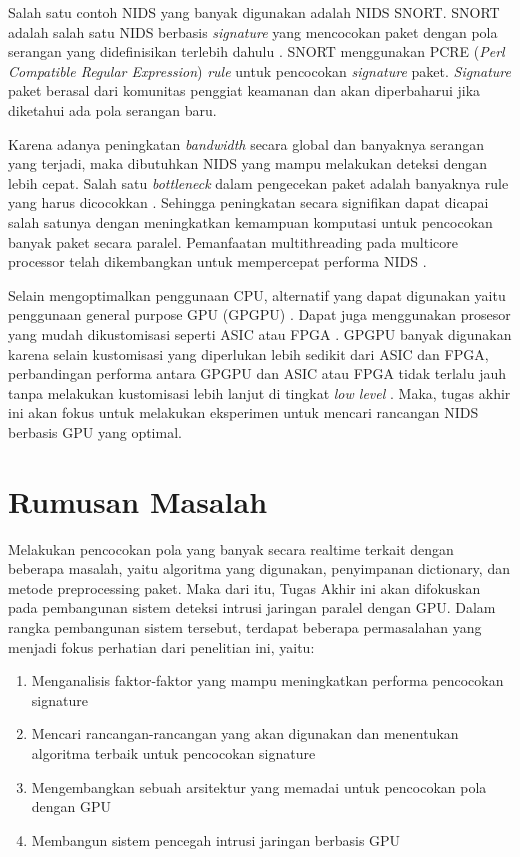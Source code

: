 Salah satu contoh NIDS yang banyak digunakan adalah NIDS SNORT. SNORT adalah salah satu NIDS berbasis \emph{signature} yang mencocokan paket dengan pola serangan yang didefinisikan terlebih dahulu \parencite{snort}. SNORT menggunakan PCRE (\emph{Perl Compatible Regular Expression}) \emph{rule} untuk pencocokan \emph{signature} paket. \emph{Signature} paket berasal dari komunitas penggiat keamanan dan akan diperbaharui jika diketahui ada pola serangan baru.

Karena adanya peningkatan \emph{bandwidth} secara global dan banyaknya serangan yang terjadi, maka dibutuhkan NIDS yang mampu melakukan deteksi dengan lebih cepat. Salah satu \emph{bottleneck} dalam pengecekan paket adalah banyaknya rule yang harus dicocokkan \parencite{pcre2007}. Sehingga peningkatan secara signifikan dapat dicapai salah satunya dengan meningkatkan kemampuan komputasi untuk pencocokan banyak paket secara paralel. Pemanfaatan multithreading pada multicore processor telah dikembangkan untuk mempercepat performa NIDS \parencite{multi2005}.

Selain mengoptimalkan penggunaan CPU, alternatif yang dapat digunakan yaitu penggunaan general purpose GPU (GPGPU) \parencite{gpu2008}. Dapat juga menggunakan prosesor yang mudah dikustomisasi seperti ASIC atau FPGA \parencite{fpga2008}. GPGPU banyak digunakan karena selain kustomisasi yang diperlukan lebih sedikit dari ASIC dan FPGA, perbandingan performa antara GPGPU dan ASIC atau FPGA tidak terlalu jauh tanpa melakukan kustomisasi lebih lanjut di tingkat \emph{low level} \parencite{gnort2008}. Maka, tugas akhir ini akan fokus untuk melakukan eksperimen untuk mencari rancangan NIDS berbasis GPU yang optimal.

\section{Rumusan Masalah}

Melakukan pencocokan pola yang banyak secara realtime terkait dengan beberapa masalah, yaitu algoritma yang digunakan, penyimpanan dictionary, dan metode preprocessing paket. Maka dari itu, Tugas Akhir ini akan difokuskan pada pembangunan sistem deteksi intrusi jaringan paralel dengan GPU. Dalam rangka pembangunan sistem tersebut, terdapat beberapa permasalahan yang menjadi fokus perhatian dari penelitian ini, yaitu:

\begin{enumerate}
    \item Menganalisis faktor-faktor yang mampu meningkatkan performa pencocokan signature
    \item Mencari rancangan-rancangan yang akan digunakan dan menentukan algoritma terbaik untuk pencocokan signature
    \item Mengembangkan sebuah arsitektur yang memadai untuk pencocokan pola dengan GPU
    \item Membangun sistem pencegah intrusi jaringan berbasis GPU
\end{enumerate}


